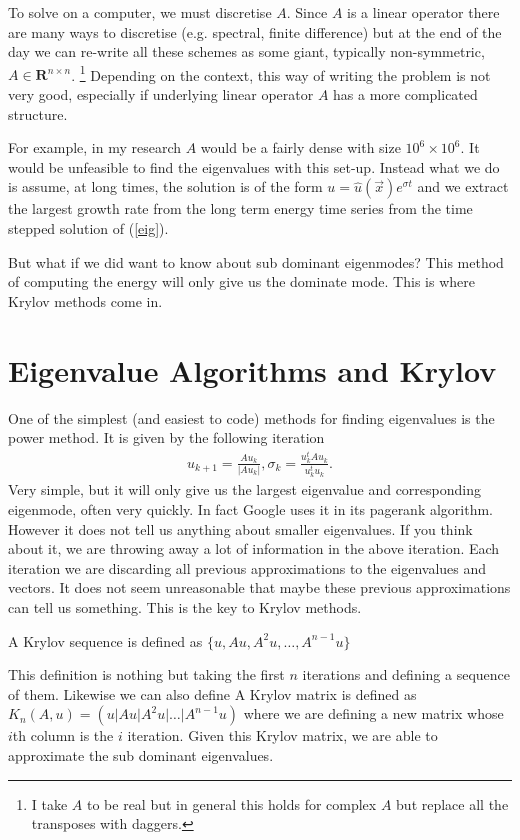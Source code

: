  To solve on a computer, we must discretise $A$. Since $A$ is a linear operator there are many ways to discretise (e.g. spectral, finite difference) but at the end of the day we can re-write all these schemes as some giant, typically non-symmetric, $A \in \textbf{R}^{n\times n}$. \footnote{I take $A$ to be real but in general this holds for complex $A$ but replace all the transposes with daggers.} Depending on the context, this way of writing the problem is not very good, especially if underlying linear operator $A$ has a more complicated structure. 

For example, in my research $A$ would be a fairly dense with size $10^{6}\times 10^{6}$. It would be unfeasible to find the eigenvalues with this set-up. Instead what we do is assume, at long times, the solution is of the form $u=\hat{u}(\vec{x})e^{\sigma t}$ and we extract the largest growth rate from the long term energy time series from the time stepped solution of (\ref{eig}). 

But what if we did want to know about sub dominant eigenmodes? This method of computing the energy will only give us the dominate mode. This is where Krylov methods come in.

\section*{Eigenvalue Algorithms and Krylov}
One of the simplest (and easiest to code) methods for finding eigenvalues is the power method. It is given by the following iteration
\begin{align}
u_{k+1}=\frac{Au_{k}}{|Au_{k}|}, \sigma_{k}=\frac{u_{k}^{t}Au_{k}}{u_{k}^{t}u_{k}}.
\end{align}
Very simple, but it will only give us the largest eigenvalue and corresponding eigenmode, often very quickly. In fact Google uses it in its pagerank algorithm. However it does not tell us anything about smaller eigenvalues. 
If you think about it, we are throwing away a lot of information in the above iteration. Each iteration we are discarding all previous approximations to the eigenvalues and vectors. It does not seem unreasonable that maybe these previous approximations can tell us something. This is the key to Krylov methods.

A Krylov sequence is defined as $\{u,Au,A^{2}u,\ldots,A^{n-1}u\}$ 

\noindent This definition is nothing but taking the first $n$ iterations and defining a sequence of them. Likewise we can also define
A Krylov matrix is defined as $K_{n}(A,u)=(u|Au|A^{2}u|\ldots|A^{n-1}u)$ 
\noindent where we are defining a new matrix whose $i$th column is the $i$ iteration. Given this Krylov matrix, we are able to approximate the sub dominant eigenvalues. 

